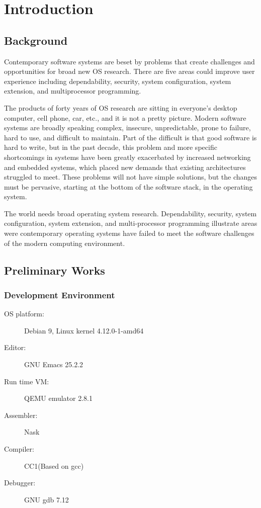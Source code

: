 \documentclass{swfcthesis}
\begin{document}
\mainmatter{}

\chapter{Introduction}

\section{Background}

Contemporary software systems are beset by problems that create challenges and
opportunities for broad new OS research. There are five areas could improve user
experience including dependability, security, system configuration, system extension, and
multiprocessor programming.

The products of forty years of OS research are sitting in everyone's desktop computer,
cell phone, car, etc., and it is not a pretty picture.  Modern software systems are
broadly speaking complex, insecure, unpredictable, prone to failure, hard to use, and
difficult to maintain. Part of the difficult is that good software is hard to write, but
in the past decade, this problem and more specific shortcomings in systems have been
greatly exacerbated by increased networking and embedded systems, which placed new demands
that existing architectures struggled to meet. These problems will not have simple
solutions, but the changes must be pervasive, starting at the bottom of the software
stack, in the operating system.

The world needs broad operating system research. Dependability, security, system
configuration, system extension, and multi-processor programming illustrate areas were
contemporary operating systems have failed to meet the software challenges of the modern
computing environment\cite{hunt2005broad}.


\section{Preliminary Works}

\subsection{Development Environment}

\begin{description}
\item[OS platform:] Debian 9, Linux kernel 4.12.0-1-amd64
\item[Editor:] GNU Emacs 25.2.2
\item[Run time VM:] QEMU emulator 2.8.1
\item[Assembler:] Nask
\item[Compiler:] CC1(Based on gcc)
\item[Debugger:] GNU gdb 7.12
\end{description}
\end{document}
